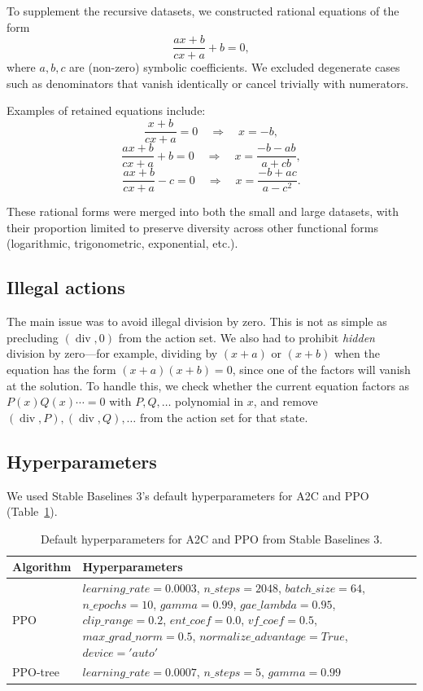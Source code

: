 \documentclass{article}
\theoremstyle{plain}
\theoremstyle{definition}
\theoremstyle{remark}
\newcommand{\op}[1]{\operatorname{#1}}
\begin{document}
To supplement the recursive datasets, we constructed rational equations of the form
\[
\frac{a x + b}{c x + a} + b = 0,
\]
where \(a,b,c\) are (non-zero) symbolic coefficients. We excluded degenerate cases such as denominators that vanish identically or cancel trivially with numerators.

Examples of retained equations include:
\[
\frac{x+b}{c x + a} = 0 
\quad \Rightarrow \quad x = -b,
\]
\[
\frac{a x+b}{c x+a} + b = 0 
\quad \Rightarrow \quad x = \frac{-b - a b}{a + c b},
\]
\[
\frac{a x+b}{c x+a} - c = 0 
\quad \Rightarrow \quad x = \frac{-b + a c}{a - c^2}.
\]

These rational forms were merged into both the small and large datasets, with their proportion limited to preserve diversity across other functional forms (logarithmic, trigonometric, exponential, etc.).

\subsection{Illegal actions}
The main issue was to avoid illegal division by zero. This is not as simple as precluding $(\op{div}, 0)$ from the action set. We also had to prohibit \emph{hidden} division by zero---for example, dividing by $(x+a)$ or $(x+b)$ when the equation has the form $(x+a)(x+b) = 0$, since one of the factors will vanish at the solution. To handle this, we check whether the current equation factors as $P(x) Q(x) \cdots = 0$ with $P, Q, \dots$ polynomial in $x$, and remove $(\op{div}, P), (\op{div}, Q), \dots$ from the action set for that state.

\subsection{Hyperparameters}
We used Stable Baselines 3's default hyperparameters for A2C and PPO (Table~\ref{hyperparams}).

\begin{table}[h]
\small
\centering
\begin{tabular}{l p{}}
\toprule
\textbf{Algorithm} & \textbf{Hyperparameters} \\
\midrule
PPO & \(learning\_rate=0.0003\), \(n\_steps=2048\), \(batch\_size=64\), \(n\_epochs=10\), \(gamma=0.99\), \(gae\_lambda=0.95\), \(clip\_range=0.2\), \(ent\_coef=0.0\), \(vf\_coef=0.5\), \(max\_grad\_norm=0.5\), \(normalize\_advantage=True\), \(device='auto'\) \\
PPO-tree & \(learning\_rate=0.0007\), \(n\_steps=5\), \(gamma=0.99\) \\
\bottomrule
\end{tabular}
\caption{Default hyperparameters for A2C and PPO from Stable Baselines 3.}
\label{hyperparams}
\end{table}
\end{document}
